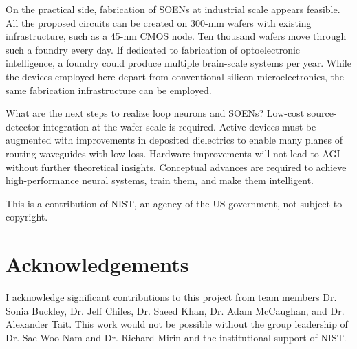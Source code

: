 \documentclass[twocolumn]{article}
\begin{document}
On the practical side, fabrication of SOENs at industrial scale appears feasible. All the proposed circuits can be created on 300-mm wafers with existing infrastructure, such as a 45-nm CMOS node. Ten thousand wafers move through such a foundry every day. If dedicated to fabrication of optoelectronic intelligence, a foundry could produce multiple brain-scale systems per year. While the devices employed here depart from conventional silicon microelectronics, the same fabrication infrastructure can be employed. 

What are the next steps to realize loop neurons and SOENs? Low-cost source-detector integration at the wafer scale is required. Active devices must be augmented with improvements in deposited dielectrics to enable many planes of routing waveguides with low loss. Hardware improvements will not lead to AGI without further theoretical insights. Conceptual advances are required to achieve high-performance neural systems, train them, and make them intelligent.

\vspace{2em}
This is a contribution of NIST, an agency of the US government, not subject to copyright.

\section{\label{sec:acknowledgements}Acknowledgements}
I acknowledge significant contributions to this project from team members Dr. Sonia Buckley, Dr. Jeff Chiles, Dr. Saeed Khan, Dr. Adam McCaughan, and Dr. Alexander Tait. This work would not be possible without the group leadership of Dr. Sae Woo Nam and Dr. Richard Mirin and the institutional support of NIST.



\end{document}
